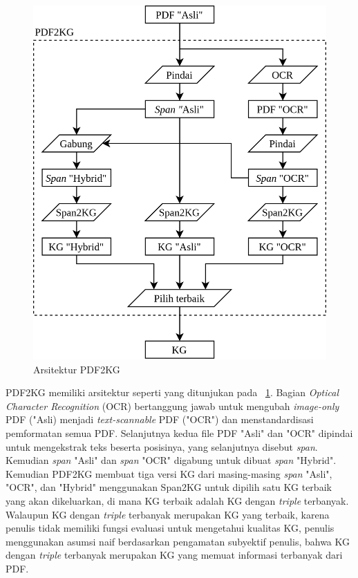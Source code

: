 \begin{figure}
  \centering
  \includegraphics[scale=0.35]{pictures/pdf2kg.png}
  \caption{Arsitektur PDF2KG}
  \label{fig:pdf2kg}
\end{figure}

PDF2KG memiliki arsitektur seperti yang ditunjukan pada \pic~\ref{fig:pdf2kg}. Bagian
\textit{Optical Character Recognition} (OCR) bertanggung jawab untuk mengubah \textit{image-only}
PDF ("Asli) menjadi \textit{text-scannable} PDF ("OCR") dan menstandardisasi pemformatan semua PDF.
Selanjutnya kedua file PDF "Asli" dan "OCR" dipindai untuk mengekstrak teks beserta posisinya, yang
selanjutnya disebut \textit{span}. Kemudian \textit{span} "Asli" dan \textit{span} "OCR" digabung
untuk dibuat \textit{span} "Hybrid". Kemudian PDF2KG membuat tiga versi KG dari masing-masing
\textit{span} "Asli", "OCR", dan "Hybrid" menggunakan Span2KG untuk dipilih satu KG terbaik yang
akan dikeluarkan, di mana KG terbaik adalah KG dengan \textit{triple} terbanyak. Walaupun KG dengan
\textit{triple} terbanyak merupakan KG yang terbaik, karena penulis tidak memiliki fungsi evaluasi
untuk mengetahui kualitas KG, penulis menggunakan asumsi naif berdasarkan pengamatan subyektif
penulis, bahwa KG dengan \textit{triple} terbanyak merupakan KG yang memuat informasi terbanyak dari
PDF.

